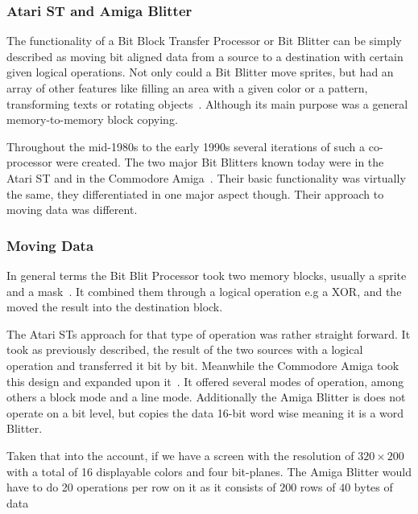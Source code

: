 \subsubsection*{Atari ST and Amiga Blitter} 
The functionality of a Bit Block Transfer Processor or Bit Blitter can be simply described as moving bit aligned data from a source to a destination with certain given logical operations. Not only could a Bit Blitter move sprites, but had an array of other features like filling an area with a given color or a pattern, transforming texts or rotating objects~\cite{atari1987blit}. Although its main purpose was a general memory-to-memory block copying.

Throughout the mid-1980s to the early 1990s several iterations of such a co-processor were created. The two major Bit Blitters known today were in the Atari ST and in the Commodore Amiga~\cite{data1988amiga}. Their basic functionality was virtually the same, they differentiated in one major aspect though. Their approach to moving data was different.

\subsubsection*{Moving Data}
In general terms the Bit Blit Processor took two memory blocks, usually a sprite and a mask~\cite{data1988amiga}. It combined them through a logical operation e.g a XOR, and the moved the result into the destination block.

The Atari STs approach for that type of operation was rather straight forward. It took as previously described, the result of the two sources with a logical operation and transferred it bit by bit. Meanwhile the Commodore Amiga took this design and expanded upon it~\cite{amigaBlitter}. It offered several modes of operation, among others a block mode and a line mode. Additionally the Amiga Blitter is does not operate on a bit level, but copies the data 16-bit word wise meaning it is a word Blitter.

Taken that into the account, if we have a screen with the resolution of \(320 \times 200\) with a total of 16 displayable colors and four bit-planes. The Amiga Blitter would have to do 20 operations per row on it as it consists of \(200\) rows of \(40\) bytes of data   

